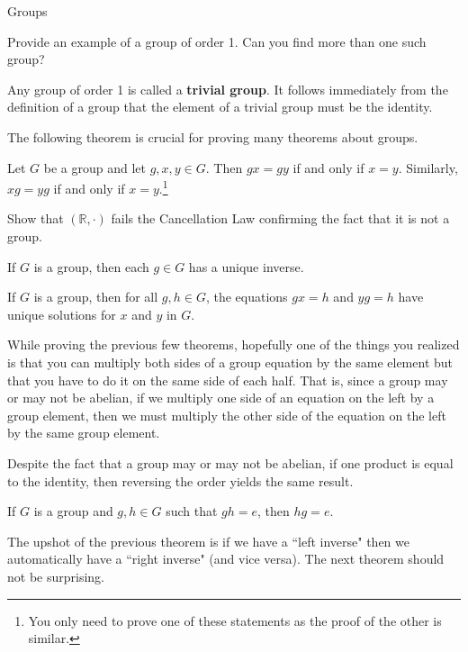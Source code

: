 \begin{section}{Groups}
\begin{problem}
Provide an example of a group of order 1.  Can you find more than one such group?
\end{problem}

Any group of order 1 is called a \textbf{trivial group}. It follows immediately from the definition of a group that the element of a trivial group must be the identity.

The following theorem is crucial for proving many theorems about groups.

\begin{theorem}
Let $G$ be a group and let $g,x,y\in G$.  Then $gx=gy$ if and only if $x=y$.  Similarly, $xg=yg$ if and only if $x=y$.\footnote{You only need to prove one of these statements as the proof of the other is similar.}
\end{theorem}

\begin{problem}
Show that $(\mathbb{R},\cdot)$ fails the Cancellation Law confirming the fact that it is not a group.
\end{problem}

\begin{corollary}
If $G$ is a group, then each $g\in G$ has a unique inverse.
\end{corollary}

\begin{theorem}\label{thm:unique_soln}
If $G$ is a group, then for all $g,h\in G$, the equations $gx=h$ and $yg=h$ have unique solutions for $x$ and $y$ in $G$.  
\end{theorem}

While proving the previous few theorems, hopefully one of the things you realized is that you can multiply both sides of a group equation by the same element but that you have to do it on the same side of each half.  That is, since a group may or may not be abelian, if we multiply one side of an equation on the left by a group element, then we must multiply the other side of the equation on the left by the same group element.

Despite the fact that a group may or may not be abelian, if one product is equal to the identity, then reversing the order yields the same result.

\begin{theorem}
If $G$ is a group and $g,h\in G$ such that $gh=e$, then $hg=e$.
\end{theorem}

The upshot of the previous theorem is if we have a ``left inverse" then we automatically have a ``right inverse" (and vice versa). The next theorem should not be surprising.


\end{section}
